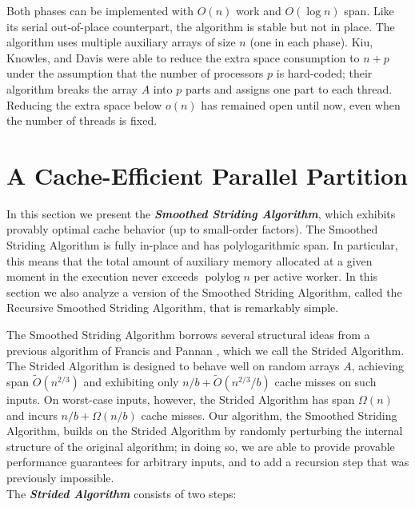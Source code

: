 \documentclass[11pt]{article}
\newcommand{\polylog}{\operatorname{polylog}}
\newcommand{\defn}[1]{{\textit{\textbf{\boldmath #1}}}}
\renewcommand{\paragraph}[1]{\vspace{0.09in}\noindent{\bf \boldmath #1.}}
\theoremstyle{remark}
\theoremstyle{remark}
\begin{document}
Both phases can be implemented with $O(n)$ work and $O(\log n)$
span. Like its serial out-of-place counterpart, the algorithm is
stable but not in place. The algorithm uses multiple auxiliary arrays
of size $n$ (one in each phase). Kiu, Knowles, and Davis
\cite{LiuKn05} were able to reduce the extra space consumption to
$n + p$ under the assumption that the number of processors $p$ is
hard-coded; their algorithm breaks the array $A$ into $p$ parts and
assigns one part to each thread. Reducing the extra space below $o(n)$
has remained open until now, even when the number of threads is fixed.

\section{A Cache-Efficient Parallel Partition}
\label{sec:recursiveSmoothedStriding}

In this section we present the \defn{Smoothed Striding
Algorithm}, which exhibits provably optimal cache behavior (up to
small-order factors). The Smoothed Striding Algorithm is fully
in-place and has polylogarithmic span. In particular, this means
that the total amount of auxiliary memory allocated at a given
moment in the execution never exceeds $\polylog n$ per active
worker. In this section we also analyze a version of the Smoothed
Striding Algorithm, called the Recursive Smoothed Striding
Algorithm, that is remarkably simple.

\paragraph{The Strided Algorithm \cite{FrancisPa92}}
The Smoothed Striding Algorithm borrows several structural ideas
from a previous algorithm of Francis and Pannan
\cite{FrancisPa92}, which we call the Strided Algorithm. The
Strided Algorithm is designed to behave well on random arrays
$A$, achieving span $\tilde{O}(n^{2/3})$ and exhibiting only $n/b
+ \tilde{O}(n^{2/3} / b)$  cache misses on such inputs. On
worst-case inputs, however, the Strided Algorithm has span
$\Omega(n)$ and incurs $n/b + \Omega(n/b)$ cache misses. Our
algorithm, the Smoothed Striding Algorithm, builds on the Strided
Algorithm by randomly perturbing the internal structure of the
original algorithm; in doing so, we are able to provide provable
performance guarantees for arbitrary inputs, and to add a
recursion step that was previously impossible. \\
The \defn{Strided Algorithm} consists of two steps:
\end{document}
